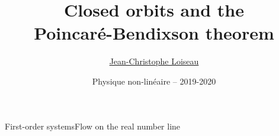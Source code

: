 \documentclass[usenames,dvipsnames,svgnames,10pt,aspectratio=169]{beamer}
\title[Nonlinear physics] %
{
	Closed orbits and the \\
  Poincaré-Bendixson theorem
}
\author[J.-Ch.~Loiseau] %
{
	\underline{Jean-Christophe Loiseau}
}
\institute[unused]
{
	\url{jean-christophe.loiseau@ensam.eu} \\
	Laboratoire DynFluid \\
	Arts et M\'etiers, France.
}
\date[unused]{Physique non-lin\'eaire -- 2019-2020}
\begin{document}
\titleframe	%


\begin{frame}[t, c]{First-order systems}{Flow on the real number line}
\end{frame}
\end{document}
